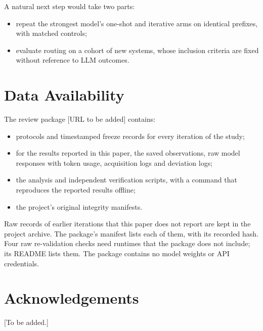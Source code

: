A natural next step would take two parts:
\begin{itemize}
  \item repeat the strongest model's one-shot and iterative arms on identical prefixes, with matched controls;
  \item evaluate routing on a cohort of new systems, whose inclusion criteria are fixed without reference to LLM outcomes.
\end{itemize}

\section*{Data Availability}

The review package [URL to be added] contains:
\begin{itemize}
  \item protocols and timestamped freeze records for every iteration of the study;
  \item for the results reported in this paper, the saved observations, raw model responses with token usage, acquisition logs and deviation logs;
  \item the analysis and independent verification scripts, with a command that reproduces the reported results offline;
  \item the project's original integrity manifests.
\end{itemize}
Raw records of earlier iterations that this paper does not report are kept in the project archive. The package's manifest lists each of them, with its recorded hash. Four raw re-validation checks need runtimes that the package does not include; its README lists them. The package contains no model weights or API credentials.

\section*{Acknowledgements}

[To be added.]





